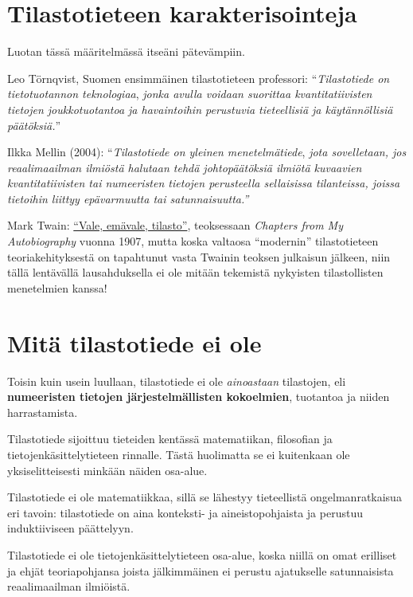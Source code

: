 \documentclass[
]{report}
\begin{document}
\hypertarget{tilastotieteen-karakterisointeja}{%
\section{Tilastotieteen
karakterisointeja}\label{tilastotieteen-karakterisointeja}}

Luotan tässä määritelmässä itseäni pätevämpiin.

Leo Törnqvist, Suomen ensimmäinen tilastotieteen professori:
``\emph{Tilastotiede on tietotuotannon teknologiaa}, \emph{jonka avulla
voidaan suorittaa kvantitatiivisten tietojen joukkotuotantoa ja
havaintoihin perustuvia tieteellisiä ja käytännöllisiä päätöksiä.}''

Ilkka Mellin (2004): ``\emph{Tilastotiede on yleinen menetelmätiede},
\emph{jota sovelletaan, jos reaalimaailman ilmiöstä halutaan tehdä
johtopäätöksiä ilmiötä kuvaavien kvantitatiivisten tai numeeristen
tietojen perusteella sellaisissa tilanteissa, joissa tietoihin liittyy
epävarmuutta tai satunnaisuutta.''}

Mark Twain: \href{https://fi.wikipedia.org/wiki/Mark_Twain}{``Vale,
emävale, tilasto''}, teoksessaan \emph{Chapters from My Autobiography}
vuonna 1907, mutta koska valtaosa ``modernin'' tilastotieteen
teoriakehityksestä on tapahtunut vasta Twainin teoksen julkaisun
jälkeen, niin tällä lentävällä lausahduksella ei ole mitään tekemistä
nykyisten tilastollisten menetelmien kanssa!

\hypertarget{mituxe4-tilastotiede-ei-ole}{%
\section{Mitä tilastotiede ei ole}\label{mituxe4-tilastotiede-ei-ole}}

Toisin kuin usein luullaan, tilastotiede ei ole \emph{ainoastaan}
tilastojen, eli \textbf{numeeristen tietojen järjestelmällisten
kokoelmien}, tuotantoa ja niiden harrastamista.

Tilastotiede sijoittuu tieteiden kentässä matematiikan, filosofian ja
tietojenkäsittelytieteen rinnalle. Tästä huolimatta se ei kuitenkaan ole
yksiselitteisesti minkään näiden osa-alue.

Tilastotiede ei ole matematiikkaa, sillä se lähestyy tieteellistä
ongelmanratkaisua eri tavoin: tilastotiede on aina konteksti- ja
aineistopohjaista ja perustuu induktiiviseen päättelyyn.

Tilastotiede ei ole tietojenkäsittelytieteen osa-alue, koska niillä on
omat erilliset ja ehjät teoriapohjansa joista jälkimmäinen ei perustu
ajatukselle satunnaisista reaalimaailman ilmiöistä.
\end{document}
